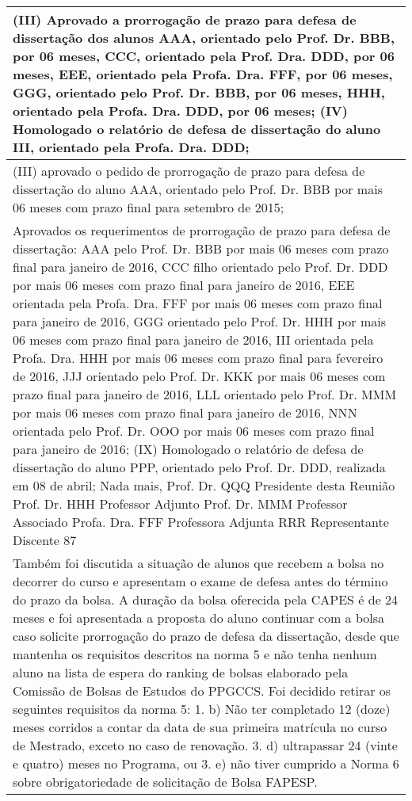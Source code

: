 
\begin{longtable}{|p{17.5cm}|}
\hline 
(III) Aprovado a prorrogação de prazo para defesa de dissertação dos alunos AAA, orientado pelo Prof. Dr. BBB, por 06 meses, CCC, orientado pela Prof. Dra. DDD, por 06 meses, EEE, orientado pela Profa. Dra. FFF, por 06 meses, GGG, orientado pelo Prof. Dr. BBB, por 06 meses, HHH, orientado pela Profa. Dra. DDD, por 06 meses; (IV) Homologado o relatório de defesa de dissertação do aluno III, orientado pela Profa. Dra. DDD;

 \\ \hline 
(III) aprovado o pedido de prorrogação de prazo para defesa de dissertação do aluno AAA, orientado pelo Prof. Dr. BBB por mais 06 meses com prazo final para setembro de 2015;

 \\ \hline 
Aprovados os requerimentos de prorrogação de prazo para defesa de dissertação: AAA pelo Prof. Dr. BBB por mais 06 meses com prazo final para janeiro de 2016, CCC filho orientado pelo Prof. Dr. DDD por mais 06 meses com prazo final para janeiro de 2016, EEE orientada pela Profa. Dra. FFF por mais 06 meses com prazo final para janeiro de 2016, GGG orientado pelo Prof. Dr. HHH por mais 06 meses com prazo final para janeiro de 2016, III orientada pela Profa. Dra. HHH por mais 06 meses com prazo final para fevereiro de 2016, JJJ orientado pelo Prof. Dr. KKK por mais 06 meses com prazo final para janeiro de 2016, LLL orientado pelo Prof. Dr. MMM por mais 06 meses com prazo final para janeiro de 2016, NNN orientada pelo Prof. Dr. OOO por mais 06 meses com prazo final para janeiro de 2016; (IX) Homologado o relatório de defesa de dissertação do aluno PPP, orientado pelo Prof. Dr. DDD, realizada em 08 de abril; Nada mais, Prof. Dr. QQQ Presidente desta Reunião Prof. Dr. HHH Professor Adjunto Prof. Dr. MMM Professor Associado Profa. Dra. FFF Professora Adjunta RRR Representante Discente 87

 \\ \hline 
Também foi discutida a situação de alunos que recebem a bolsa no decorrer do curso e apresentam o exame de defesa antes do término do prazo da bolsa. A duração da bolsa oferecida pela CAPES é de 24 meses e foi apresentada a proposta do aluno continuar com a bolsa caso solicite prorrogação do prazo de defesa da dissertação, desde que mantenha os requisitos descritos na norma 5 e não tenha nenhum aluno na lista de espera do ranking de bolsas elaborado pela Comissão de Bolsas de Estudos do PPGCCS. Foi decidido retirar os seguintes requisitos da norma 5: 1. b) Não ter completado 12 (doze) meses corridos a contar da data de sua primeira matrícula no curso de Mestrado, exceto no caso de renovação. 3. d) ultrapassar 24 (vinte e quatro) meses no Programa, ou 3. e) não tiver cumprido a Norma 6 sobre obrigatoriedade de solicitação de Bolsa FAPESP.


\end{longtable}
